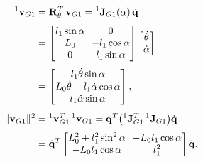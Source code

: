 \begin{equation}
    \setlength{\arraycolsep}{3.5pt}
    \begin{aligned}
        {}^{1}\mathbf{v}_{G1} &= \mathbf{R}_\theta^T\,\mathbf{v}_{G1} = {}^{1}\mathbf{J}_{G1}(\alpha)\,\dot{\mathbf{q}} \\[3pt]
        &= \begin{bmatrix}
            l_1\sin\alpha & 0 \\
            L_0 & -l_1\cos\alpha \\
            0 & l_1\sin\alpha
        \end{bmatrix}
        \begin{bmatrix} \dot{\theta} \\ \dot{\alpha} \end{bmatrix} \\[3pt]
        &= \begin{bmatrix}
            l_1\dot{\theta}\sin\alpha \\
            L_0\dot{\theta} - l_1\dot{\alpha}\cos\alpha \\
            l_1\dot{\alpha}\sin\alpha
        \end{bmatrix}, \\[4pt]
        \|\mathbf{v}_{G1}\|^2 &= {}^{1}\mathbf{v}_{G1}^T\,{}^{1}\mathbf{v}_{G1}
        = \dot{\mathbf{q}}^T\bigl({}^{1}\mathbf{J}_{G1}^T\,{}^{1}\mathbf{J}_{G1}\bigr)\dot{\mathbf{q}} \\[3pt]
        &= \dot{\mathbf{q}}^T
        \begin{bmatrix}
            L_0^2 + l_1^2\sin^2\alpha & -L_0 l_1\cos\alpha \\
            -L_0 l_1\cos\alpha & l_1^2
        \end{bmatrix}
        \dot{\mathbf{q}}.
    \end{aligned}
    \label{eq:v_g1_cuadrado}
\end{equation}


